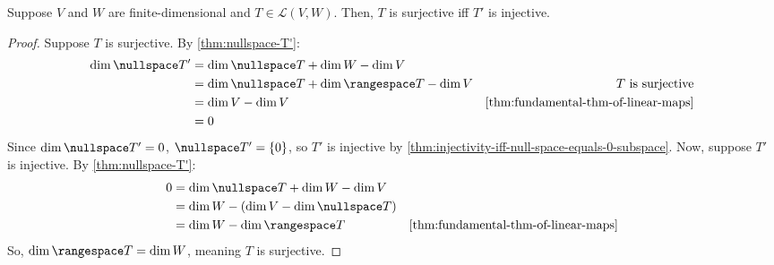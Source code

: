 \documentclass{article}
\begin{document}
\begin{theorem}
  \label{thm:T-surjective-iff-T'-injective}
  Suppose $V$ and $W$ are finite-dimensional and $T \in \mathcal{L}(V,
  W)$. Then, $T$ is surjective iff $T'$ is injective.
\end{theorem}
\begin{proof}
  Suppose $T$ is surjective. By \cref{thm:nullspace-T'}:
  \begin{align*}
    \dim \nullspace T' &= \dim \nullspace T + \dim W - \dim V \\
    &= \dim \nullspace T + \dim \rangespace T - \dim V & \text{ $T$ is
                                                         surjective}
    \\
    &= \dim V - \dim V &
                         \text{\cref{thm:fundamental-thm-of-linear-maps}}
    \\
    &= 0
  \end{align*}
  Since $\dim \nullspace T' = 0$, $\nullspace T' = \{0\}$, so $T'$ is
  injective by
  \cref{thm:injectivity-iff-null-space-equals-0-subspace}. Now,
  suppose $T'$ is injective. By \cref{thm:nullspace-T'}:
  \begin{align*}
    0 &= \dim \nullspace T + \dim W - \dim V \\
      &= \dim W - (\dim V - \dim \nullspace T) \\
      &= \dim W - \dim \rangespace T &
                                       \text{\cref{thm:fundamental-thm-of-linear-maps}} \\ 
  \end{align*}
  So, $\dim \rangespace T = \dim W$, meaning $T$ is surjective.
\end{proof}
\end{document}
